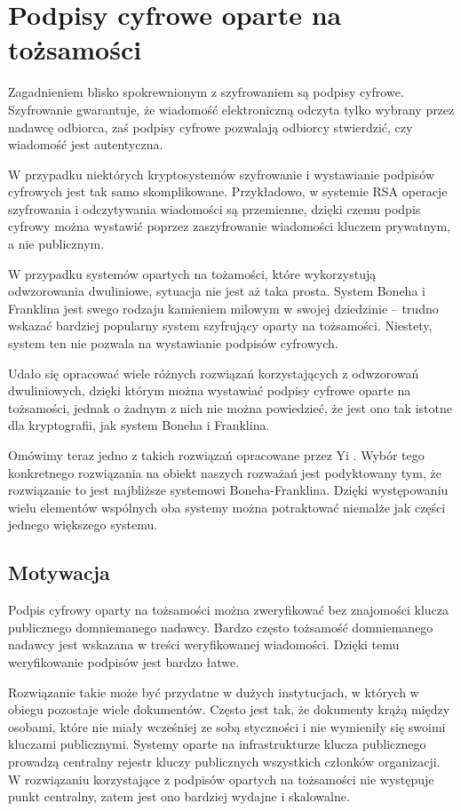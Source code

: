 \section{Podpisy cyfrowe oparte na tożsamości}

\noindent
Zagadnieniem blisko spokrewnionym z szyfrowaniem są podpisy cyfrowe.
Szyfrowanie gwarantuje,
że wiadomość elektroniczną odczyta tylko wybrany przez nadawcę odbiorca,
zaś podpisy cyfrowe pozwalają odbiorcy stwierdzić,
czy wiadomość jest autentyczna.

\noindent
W przypadku niektórych kryptosystemów
szyfrowanie i wystawianie podpisów cyfrowych jest tak samo skomplikowane.
Przykładowo,
w systemie RSA operacje szyfrowania i odczytywania wiadomości są przemienne,
dzięki czemu podpis cyfrowy można wystawić
poprzez zaszyfrowanie wiadomości kluczem prywatnym, a nie publicznym.

\noindent
W przypadku systemów opartych na tożamości,
które wykorzystują odwzorowania dwuliniowe,
sytuacja nie jest aż taka prosta.
System Boneha i Franklina jest swego rodzaju kamieniem milowym
w swojej dziedzinie --
trudno wskazać bardziej popularny system szyfrujący oparty na tożsamości.
Niestety, system ten nie pozwala na wystawianie podpisów cyfrowych.

\noindent
Udało się opracować wiele różnych rozwiązań
korzystających z odwzorowań dwuliniowych,
dzięki którym można wystawiać podpisy cyfrowe oparte na tożsamości,
jednak o żadnym z nich nie można powiedzieć,
że jest ono tak istotne dla kryptografii,
jak system Boneha i Franklina.

\noindent
Omówimy teraz jedno z takich rozwiązań
opracowane przez Yi \cite{yi}.
Wybór tego konkretnego rozwiązania na obiekt naszych rozważań
jest podyktowany tym,
że rozwiązanie to jest najbliższe systemowi Boneha-Franklina.
Dzięki występowaniu wielu elementów wspólnych
oba systemy można potraktować niemalże jak części jednego większego systemu.

\subsection*{Motywacja}

\noindent
Podpis cyfrowy oparty na tożsamości można zweryfikować
bez znajomości klucza publicznego domniemanego nadawcy.
Bardzo często tożsamość domniemanego nadawcy
jest wskazana w treści weryfikowanej wiadomości.
Dzięki temu weryfikowanie podpisów jest bardzo łatwe.

\noindent
Rozwiązanie takie może być przydatne w dużych instytucjach,
w których w obiegu pozostaje wiele dokumentów.
Często jest tak, że dokumenty krążą między osobami,
które nie miały wcześniej ze sobą styczności
i nie wymieniły się swoimi kluczami publicznymi.
Systemy oparte na infrastrukturze klucza publicznego
prowadzą centralny rejestr kluczy publicznych
wszystkich członków organizacji.
W rozwiązaniu korzystające z podpisów opartych na tożsamości
nie występuje punkt centralny,
zatem jest ono bardziej wydajne i skalowalne.

